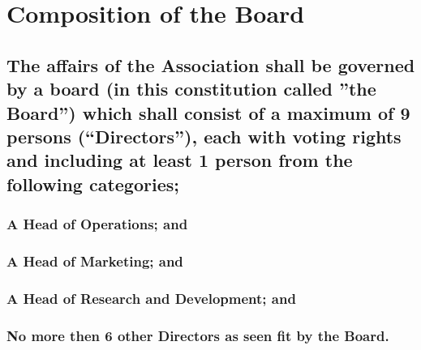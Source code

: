 \documentclass{article}
\newenvironment{subs}
  {\adjustwidth{2em}{0pt}}
  {\endadjustwidth}
\begin{document}
\section{Composition of the Board}
\begin{subs}
\subsection{The affairs of the Association shall be governed by a board (in this constitution called ''the Board'') which shall consist of a maximum of 9 persons (``Directors''), each with voting rights and including at least 1 person from the following categories;}
\begin{subs}
\subsubsection{A Head of Operations; and}
\subsubsection{A Head of Marketing; and}
\subsubsection{A Head of Research and Development; and}
\subsubsection{No more then 6 other Directors as seen fit by the Board.}
\end{subs}
\end{subs}
\end{document}

